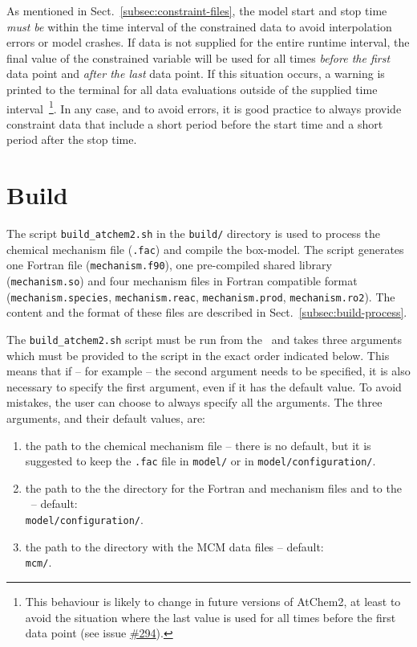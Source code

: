As mentioned in Sect.~\ref{subsec:constraint-files}, the model start
and stop time \emph{must be} within the time interval of the
constrained data to avoid interpolation errors or model crashes. If
data is not supplied for the entire runtime interval, the final value
of the constrained variable will be used for all times
\emph{before the first} data point and \emph{after the last} data
point. If this situation occurs, a warning is printed to the terminal
for all data evaluations outside of the supplied time
interval~\footnote{This behaviour is likely to change in future
  versions of AtChem2, at least to avoid the situation where the last
  value is used for all times before the first data point (see issue
  \href{https://github.com/AtChem/AtChem2/issues/294}{\#294}).}. In any
case, and to avoid errors, it is good practice to always provide
constraint data that include a short period before the start time and
a short period after the stop time.

\section{Build} \label{sec:build}

The script \texttt{build\_atchem2.sh} in the \texttt{build/} directory
is used to process the chemical mechanism file (\texttt{.fac}) and
compile the box-model. The script generates one Fortran file
(\texttt{mechanism.f90}), one pre-compiled shared library
(\texttt{mechanism.so}) and four mechanism files in Fortran compatible
format (\texttt{mechanism.species}, \texttt{mechanism.reac},
\texttt{mechanism.prod}, \texttt{mechanism.ro2}). The content and the
format of these files are described in Sect.~\ref{subsec:build-process}.

The \texttt{build\_atchem2.sh} script must be run from the \maindir\
and takes three arguments which must be provided to the script in the
exact order indicated below. This means that if -- for example -- the
second argument needs to be specified, it is also necessary to specify
the first argument, even if it has the default value. To avoid
mistakes, the user can choose to always specify all the arguments. The
three arguments, and their default values, are:

\begin{enumerate}
\item the path to the chemical mechanism file -- there is no default,
  but it is suggested to keep the \texttt{.fac} file in
  \texttt{model/} or in \texttt{model/configuration/}.
\item the path to the the directory for the Fortran and mechanism
  files and to the \sharedir\ -- default:\\
  \texttt{model/configuration/}.
\item the path to the directory with the MCM data files -- default:\\
  \texttt{mcm/}.
\end{enumerate}

